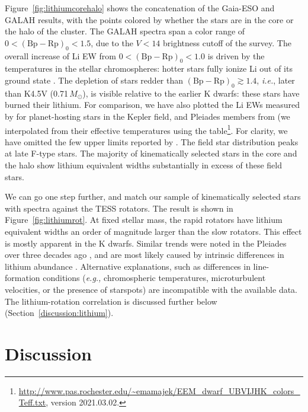 \documentclass[12pt,twocolumn,tighten]{aastex63}
\newcommand{\bpmrp}{(\mathrm{Bp}-\mathrm{Rp})_0}
\begin{document}
Figure~\ref{fig:lithiumcorehalo} shows the concatenation of the
Gaia-ESO and GALAH results, with the points colored by whether the
stars are in the core or the halo of the cluster.  The GALAH spectra
span a color range of $0<\bpmrp<1.5$, due to the $V<14$ brightness
cutoff of the survey.  The overall increase of Li EW from
$0<\bpmrp<1.0$ is driven by the temperatures in the stellar
chromospheres: hotter stars fully ionize Li out of its ground state
\citep[{\it e.g.}, Figure~4 of][]{soderblom_evolution_1993}.  The
depletion of stars redder than $\bpmrp\gtrsim1.4$, {\it i.e.}, later
than K4.5V (0.71\,$M_\odot$), is visible relative to the earlier K
dwarfs: these stars have burned their lithium.  For comparison, we
have also plotted the Li EWs measured by
\citet{berger_identifying_2018} for planet-hosting stars in the Kepler
field, and Pleiades members from \citet{bouvier_pleiades_lirot_2018}
(we interpolated from their effective temperatures using the
\citet{pecaut_mamajek_2013}
table\footnote{\url{http://www.pas.rochester.edu/~emamajek/EEM_dwarf_UBVIJHK_colors_Teff.txt},
version 2021.03.02.}.  For clarity, we have omitted the few upper
limits reported by \citet{bouvier_pleiades_lirot_2018}.  The field
star distribution peaks at late F-type stars.  The majority of
kinematically selected stars in the core and the halo show lithium
equivalent widths substantially in excess of these field stars.

We can go one step further, and match our sample of kinematically
selected stars with spectra against the TESS rotators.  The result is
shown in Figure~\ref{fig:lithiumrot}. At fixed stellar mass, the rapid
rotators have lithium equivalent widths an order of magnitude larger
than the slow rotators.  This effect is mostly apparent in the K
dwarfs.  Similar trends were noted in the Pleiades over three decades
ago \citep{butler_pleiades_1987}, and are most likely caused by
intrinsic differences in lithium abundance
\citep{soderblom_evolution_1993}.  Alternative explanations, such as
differences in line-formation conditions ({\it e.g.,} chromospheric
temperatures, microturbulent velocities, or the presence of starspots)
are incompatible with the available data.  The lithium-rotation
correlation is discussed further below
(Section~\ref{discussion:lithium}).




\section{Discussion}
\label{sec:discussion}
\end{document}
